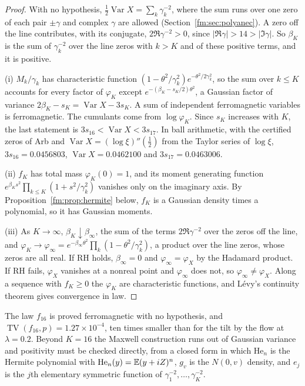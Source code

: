 \begin{proof}
With no hypothesis, $\frac12\operatorname{Var}X=\sum_k\gamma_k^{-2}$, where the sum runs over one zero of each pair $\pm\gamma$ and complex $\gamma$ are allowed (Section~\ref{fm:sec:polyanec}). A zero off the line contributes, with its conjugate, $2\Re\gamma^{-2}>0$, since $|\Re\gamma|>14>|\Im\gamma|$. So $\beta_K$ is the sum of $\gamma_k^{-2}$ over the line zeros with $k>K$ and of these positive terms, and it is positive.

(i) $M_k/\gamma_k$ has characteristic function $(1-\theta^2/\gamma_k^2)e^{-\theta^2/2\gamma_k^2}$, so the sum over $k\le K$ accounts for every factor of $\varphi_K$ except $e^{-(\beta_K-s_K/2)\theta^2}$, a Gaussian factor of variance $2\beta_K-s_K=\operatorname{Var}X-3s_K$. A sum of independent ferromagnetic variables is ferromagnetic. The cumulants come from $\log\varphi_K$. Since $s_K$ increases with $K$, the last statement is $3s_{16}<\operatorname{Var}X<3s_{17}$. In ball arithmetic, with the certified zeros of Arb \cite{Arb} and $\operatorname{Var}X=(\log\xi)''(\frac12)$ from the Taylor series of $\log\xi$, $3s_{16}=0.0456803$, $\operatorname{Var}X=0.0462100$ and $3s_{17}=0.0463006$.

(ii) $f_K$ has total mass $\varphi_K(0)=1$, and its moment generating function $e^{\beta_Ks^2}\prod_{k\le K}(1+s^2/\gamma_k^2)$ vanishes only on the imaginary axis. By Proposition~\ref{fm:prop:hermite} below, $f_K$ is a Gaussian density times a polynomial, so it has Gaussian moments.

(iii) As $K\to\infty$, $\beta_K\downarrow\beta_\infty$, the sum of the terms $2\Re\gamma^{-2}$ over the zeros off the line, and $\varphi_K\to\varphi_\infty=e^{-\beta_\infty\theta^2}\prod_k(1-\theta^2/\gamma_k^2)$, a product over the line zeros, whose zeros are all real. If RH holds, $\beta_\infty=0$ and $\varphi_\infty=\varphi_X$ by the Hadamard product. If RH fails, $\varphi_X$ vanishes at a nonreal point and $\varphi_\infty$ does not, so $\varphi_\infty\ne\varphi_X$. Along a sequence with $f_K\ge0$ the $\varphi_K$ are characteristic functions, and L\'evy's continuity theorem gives convergence in law.
\end{proof}

The law $f_{16}$ is proved ferromagnetic with no hypothesis, and $\operatorname{TV}(f_{16},p)=1.27\times10^{-4}$, ten times smaller than for the tilt by the flow at $\lambda=0.2$. Beyond $K=16$ the Maxwell construction runs out of Gaussian variance and positivity must be checked directly, from a closed form in which $\mathrm{He}_n$ is the Hermite polynomial with $\mathrm{He}_n(y)=\mathbb{E}(y+iZ)^n$, $g_v$ is the $N(0,v)$ density, and $e_j$ is the $j$th elementary symmetric function of $\gamma_1^{-2},\dots,\gamma_K^{-2}$.

